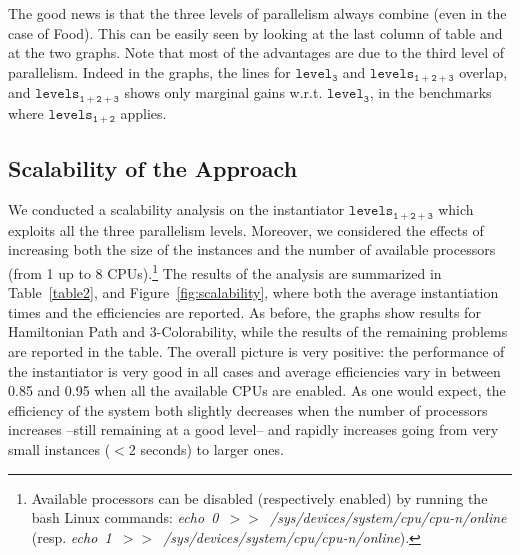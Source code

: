 \documentclass[preprint]{tlp}
\newcommand{\kali}{\ensuremath{\mathtt{levels_{1\!+\!2}}}\xspace}
\newcommand{\splitonly}{\ensuremath{\mathtt{level_3}}\xspace}
\newcommand{\paral}{\ensuremath{\mathtt{levels_{1\!+\!2\!+\!3}}}\xspace}
\begin{document}
The good news is that the three levels of parallelism always combine
(even in the case of Food). This can be easily seen by looking at the last column of table and at the two graphs.
Note that most of the advantages are due to the third level of parallelism. Indeed in the graphs, the lines
for \splitonly and \paral overlap, and \paral shows only marginal gains w.r.t. \splitonly, in the benchmarks
where \kali applies.


\subsection{Scalability of the Approach}
We conducted a scalability analysis on the instantiator \paral which exploits all the three parallelism levels.
Moreover, we considered the effects of increasing both the size of the instances and the number of available processors (from 1 up to 8 CPUs).\footnote{
Available processors can be disabled (respectively enabled) by running the bash Linux commands:
\mbox{{\em echo 0 $>>$ /sys/devices/system/cpu/cpu-n/online}} (resp. \mbox{{\em echo 1 $>>$ /sys/devices/system/cpu/cpu-n/online}}).
}
The results of  the analysis are summarized in Table~\ref{table2}, and
Figure~\ref{fig:scalability}, where both the average instantiation times and the efficiencies are reported.
As before, the graphs show results for Hamiltonian Path and 3-Colorability,
while the results of the remaining problems are reported in the table.
The overall picture is very positive: the performance of the instantiator
is very good in all cases and average efficiencies vary in between 0.85 and 0.95 when all the available CPUs are enabled.
As one would expect, the efficiency of the system both slightly decreases when the number of processors
increases --still remaining at a good level-- and rapidly increases going from very small instances
($<$2 seconds) to larger ones.

\begin{figure*}[t]
\centering
{}
\hspace{0.0cm}
\hspace{5mm}
\centering
{}
\hspace{0.0cm}
\hspace{5mm}
\caption{Hamiltonian Path and 3-Colorability: average instantiation times (s) and efficiency}\label{fig:scalability}
\end{figure*}
\end{document}
